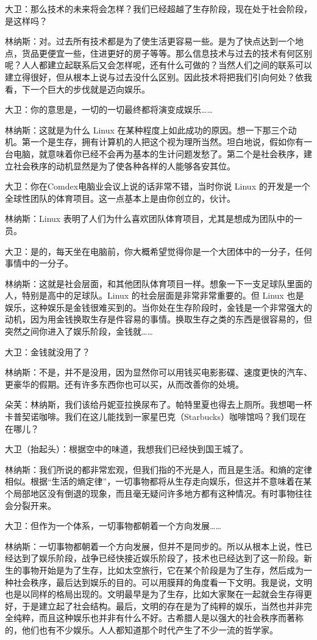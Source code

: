\documentclass[12pt,UTF8]{ctexbook}
\begin{document}
大卫：那么技术的未来将会怎样？我们已经超越了生存阶段，现在处于社会阶段，是这样吗？

林纳斯：对。过去所有技术都是为了使生活更容易一些。是为了快点达到一个地点，货品更便宜一些，住进更好的房子等等。那么信息技术与过去的技术有何区别呢？人人都建立起联系后又会怎样呢，还有什么可做的？当然人们之间的联系可以建立得很好，但从根本上说与过去没什么区别。因此技术将把我们引向何处？依我看，下一个巨大的步伐就是迈向娱乐。

大卫：你的意思是，一切的一切最终都将演变成娱乐……

林纳斯：这就是为什么 Linux 在某种程度上如此成功的原因。想一下那三个动机。第一个是生存，拥有计算机的人把这个视为理所当然。坦白地说，假如你有一台电脑，就意味着你已经不会再为基本的生计问题发愁了。第二个是社会秩序，建立社会秩序的动机显然是为了使各种各样的人能够各安其位。

大卫：你在Comdex电脑业会议上说的话非常不错，当时你说 Linux 的开发是一个全球性团队的体育项目。这一点基本上是由你创立的，伙计。

林纳斯：Linux 表明了人们为什么喜欢团队体育项目，尤其是想成为团队中的一员。

大卫：是的，每天坐在电脑前，你大概希望觉得你是一个大团体中的一分子，任何事情中的一分子。

林纳斯：这就是社会层面，和其他团队体育项目一样。想象一下一支足球队里面的人，特别是高中的足球队。Linux 的社会层面是非常非常重要的。但 Linux 也是娱乐，这种娱乐是金钱很难买到的。当你处在生存阶段时，金钱是一个非常强大的动机，因为用金钱换取生存是件容易的事情。换取生存之类的东西是很容易的，但突然之间你进入了娱乐阶段，金钱就……

大卫：金钱就没用了？

林纳斯：不是，并不是没用，因为显然你可以用钱买电影影碟、速度更快的汽车、更豪华的假期。还有许多东西你也可以买，从而改善你的处境。

朵芙：林纳斯，我们该给丹妮亚拉换尿布了。帕特里夏也得去上厕所。我想喝一杯卡普契诺咖啡。我们在这儿能找到一家星巴克（Starbucks）咖啡馆吗？我们现在在哪儿？

大卫（抬起头）：根据空中的味道，我想我们已经快到国王城了。

林纳斯：我们所说的都非常宏观，但我们指的不光是人，而且是生活。和熵的定律相似。根据“生活的熵定律”，一切事物都将从生存走向娱乐，但这并不意味着在某个局部地区没有倒退的现象，而且毫无疑问许多地方都有这种情况。有时事物往往会分裂开来。

大卫：但作为一个体系，一切事物都朝着一个方向发展……

林纳斯：一切事物都朝着一个方向发展，但并不是同步的。所以从根本上说，性已经达到了娱乐阶段，战争已经快接近娱乐阶段了，技术也已经达到了这一阶段。新生的事物开始是为了生存，比如太空旅行，它在某个阶段是为了生存，然后成为一种社会秩序，最后达到娱乐的目的。可以用膜拜的角度看一下文明。我是说，文明也是以同样的格局出现的。文明最早是为了生存，比如大家聚在一起就会生存得更好，于是建立起了社会结构。最后，文明的存在是为了纯粹的娱乐，当然也并非完全纯粹，而且这种娱乐也并非有什么不好。古希腊人是以强大的社会秩序而著称的，他们也有不少娱乐。人人都知道那个时代产生了不少一流的哲学家。
\end{document}
